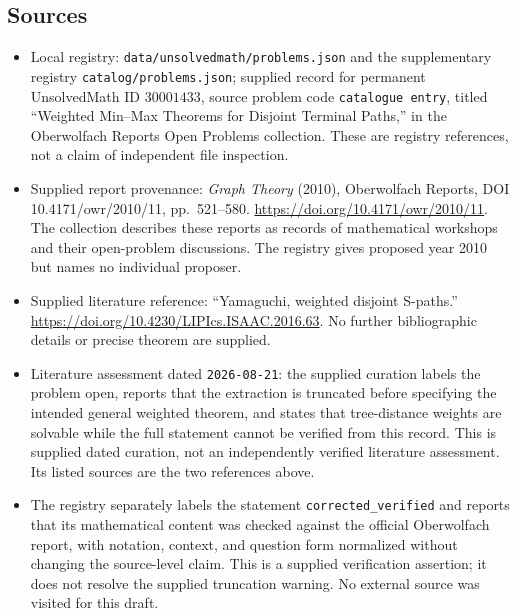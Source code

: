 \documentclass[11pt]{article}
\begin{document}
\subsection{Sources}
\begin{itemize}
\item Local registry: \texttt{data/unsolvedmath/problems.json} and the supplementary registry \texttt{catalog/problems.json}; supplied record for permanent UnsolvedMath ID \(30001433\), source problem code \texttt{catalogue entry}, titled ``Weighted Min--Max Theorems for Disjoint Terminal Paths,'' in the Oberwolfach Reports Open Problems collection. These are registry references, not a claim of independent file inspection.
\item Supplied report provenance: \emph{Graph Theory} (2010), Oberwolfach Reports, DOI 10.4171/owr/2010/11, pp.~521--580. \url{https://doi.org/10.4171/owr/2010/11}. The collection describes these reports as records of mathematical workshops and their open-problem discussions. The registry gives proposed year 2010 but names no individual proposer.
\item Supplied literature reference: ``Yamaguchi, weighted disjoint S-paths.'' \url{https://doi.org/10.4230/LIPIcs.ISAAC.2016.63}. No further bibliographic details or precise theorem are supplied.
\item Literature assessment dated \texttt{2026-08-21}: the supplied curation labels the problem open, reports that the extraction is truncated before specifying the intended general weighted theorem, and states that tree-distance weights are solvable while the full statement cannot be verified from this record. This is supplied dated curation, not an independently verified literature assessment. Its listed sources are the two references above.
\item The registry separately labels the statement \texttt{corrected\_verified} and reports that its mathematical content was checked against the official Oberwolfach report, with notation, context, and question form normalized without changing the source-level claim. This is a supplied verification assertion; it does not resolve the supplied truncation warning. No external source was visited for this draft.
\end{itemize}
\end{document}
